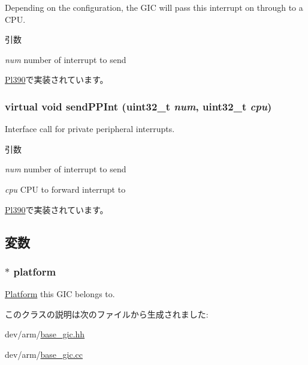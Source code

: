 Depending on the configuration, the GIC will pass this interrupt on through to a CPU.


\begin{DoxyParams}{引数}
\item[{\em num}]number of interrupt to send \end{DoxyParams}


\hyperlink{classPl390_afbcaff37cd3cabac35c8fa0154de991f}{Pl390}で実装されています。\hypertarget{classBaseGic_a89cc9c4f60c3456dca807a71da1e04a8}{
\subsubsection[{sendPPInt}]{\setlength{\rightskip}{0pt plus 5cm}virtual void sendPPInt ({\bf uint32\_\-t} {\em num}, \/  {\bf uint32\_\-t} {\em cpu})}}
\label{classBaseGic_a89cc9c4f60c3456dca807a71da1e04a8}
Interface call for private peripheral interrupts.


\begin{DoxyParams}{引数}
\item[{\em num}]number of interrupt to send \item[{\em cpu}]CPU to forward interrupt to \end{DoxyParams}


\hyperlink{classPl390_a4780a1058316daff7b2c8f980c681101}{Pl390}で実装されています。

\subsection{変数}
\hypertarget{classBaseGic_a75b48f1787959a4617f2a599d7c09aab}{
\subsubsection[{platform}]{$\ast$ {\bf platform}}}
\label{classBaseGic_a75b48f1787959a4617f2a599d7c09aab}
\hyperlink{classPlatform}{Platform} this GIC belongs to. 

このクラスの説明は次のファイルから生成されました:\begin{DoxyCompactItemize}
\item 
dev/arm/\hyperlink{base__gic_8hh}{base\_\-gic.hh}\item 
dev/arm/\hyperlink{base__gic_8cc}{base\_\-gic.cc}\end{DoxyCompactItemize}
